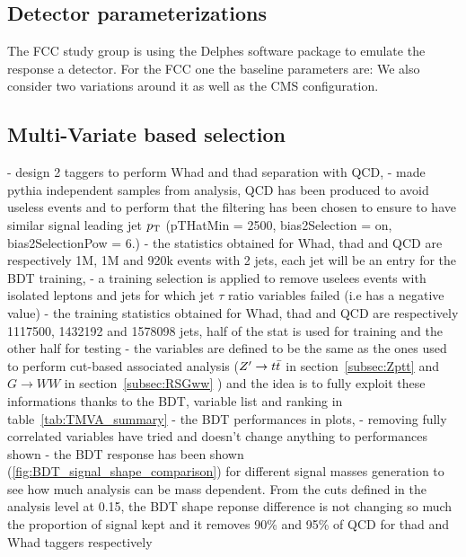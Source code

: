 \documentclass{cernrep}
\begin{document}
\subsection{Detector parameterizations}
The FCC study group is using the Delphes software package to emulate the response a detector. 
For the FCC one the baseline parameters are:
We also consider two variations around it as well as the CMS configuration.


\subsection{Multi-Variate based selection}
- design 2 taggers to perform Whad and thad separation with QCD,
- made pythia independent samples from analysis, QCD has been produced to avoid useless events and to perform that the filtering has been chosen to ensure to have similar signal leading jet $p\sb{\scriptstyle\mathrm{T}}$ (pTHatMin = 2500, bias2Selection = on, bias2SelectionPow = 6.)
- the statistics obtained for Whad, thad and QCD are respectively 1M, 1M and 920k events with 2 jets, each jet will be an entry for the BDT training,
- a training selection is applied to remove uselees events with isolated leptons and jets for which jet $\tau$ ratio variables failed (i.e has a negative value)
- the training statistics obtained for Whad, thad and QCD are respectively 1117500, 1432192 and 1578098 jets, half of the stat is used for training and the other half for testing
- the variables are defined to be the same as the ones used to perform cut-based associated analysis ($Z^{\prime} \rightarrow t\bar{t}$ in section~\ref{subsec:Zptt} and $G \rightarrow WW$ in section~\ref{subsec:RSGww} ) and the idea is to fully exploit these informations thanks to the BDT, variable list and ranking in table~\ref{tab:TMVA_summary}
- the BDT performances in plots, 
- removing fully correlated variables have tried and doesn't change anything to performances shown
- the BDT response has been shown (\ref{fig:BDT_signal_shape_comparison}) for different signal masses generation to see how much analysis can be mass dependent. From the cuts defined in the analysis level at 0.15, the BDT shape reponse difference is not changing so much the proportion of signal kept and it removes 90\% and 95\% of QCD for thad and Whad taggers respectively
\end{document}
